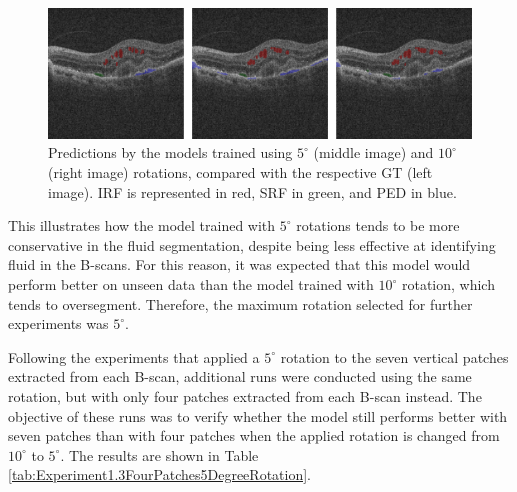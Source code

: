 \begin{figure}[!ht]
	\centering
	\includegraphics[width=1.0\linewidth]{figures/SegmentationsComparisonBetweenDifferentRotations.png}
	\caption{Predictions by the models trained using $5^{\circ}$ (middle image) and $10^{\circ}$ (right image) rotations, compared with the respective GT (left image). IRF is represented in red, SRF in green, and PED in blue.}
	\label{fig:SegmentationsComparisonBetweenDifferentRotations}
\end{figure}

This illustrates how the model trained with $5^{\circ}$ rotations tends to be more conservative in the fluid segmentation, despite being less effective at identifying fluid in the B-scans. For this reason, it was expected that this model would perform better on unseen data than the model trained with $10^{\circ}$ rotation, which tends to oversegment. Therefore, the maximum rotation selected for further experiments was $5^{\circ}$.
\par
Following the experiments that applied a $5^{\circ}$ rotation to the seven vertical patches extracted from each B-scan, additional runs were conducted using the same rotation, but with only four patches extracted from each B-scan instead. The objective of these runs was to verify whether the model still performs better with seven patches than with four patches when the applied rotation is changed from $10^{\circ}$ to $5^{\circ}$. The results are shown in Table \ref{tab:Experiment1.3FourPatches5DegreeRotation}.

